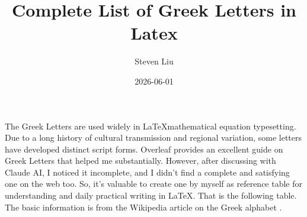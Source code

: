 \documentclass{pensee}
\title{Complete List of Greek Letters in Latex}
\author{Steven Liu}
\date{2026-06-01}
\newcommand{\latex}{\LaTeX\;}
\begin{document}
\maketitle

The Greek Letters are used widely in \latex  mathematical equation typesetting. Due to a long history of cultural transmission and regional variation, some letters have developed distinct script forms. Overleaf provides an excellent guide \cite{overleaf:mathsymbols} on Greek Letters that helped me substantially. However, after discussing with Claude AI, I noticed it incomplete, and I didn't find a complete and satisfying one on the web too. So, it's valuable to create one by myself as reference table for understanding and daily practical writing in LaTeX. That is the following table. The basic information is from the Wikipedia article on the Greek alphabet \cite{wiki:greek_alphabet}.
\end{document}
